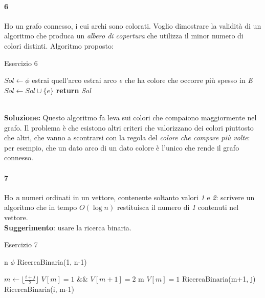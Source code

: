 \paragraph{6}
Ho un grafo connesso, i cui archi sono colorati. Voglio dimostrare la validità di un algoritmo che produca un \textit{albero di copertura} che utilizza il minor numero di colori distinti. Algoritmo proposto: \hfill
\begin{algorithm}
	\caption{Esercizio 6}\label{alg:es6}
	\begin{algorithmic}[1]
		\State $Sol \gets \phi$
		\State estrai quell'arco
		\Else
		\State estrai arco \textit{e} che ha colore che occorre più spesso in \textit{E}
		\EndIf
		\State $Sol \gets Sol \cup \{e\}$
		\EndIf
		\EndWhile
		\State \textbf{return} \textit{Sol}
		\EndFunction
	\end{algorithmic}
\end{algorithm} \\ \hfill
\textbf{Soluzione:} Questo algoritmo fa leva sui colori che compaiono maggiormente nel grafo. Il problema è che esistono altri criteri che valorizzano dei colori piuttosto che altri, che vanno a scontrarsi con la regola del \textit{colore che compare più volte}: per esempio, che un dato arco di un dato colore è l'unico che rende il grafo connesso.

\paragraph{7}
Ho \textit{n} numeri ordinati in un vettore, contenente soltanto valori \textit{1} e \textit{2}: scrivere un algoritmo che in tempo $O(\log{n})$ restituisca il numero di \textit{1} contenuti nel vettore. \\
\textbf{Suggerimento}: usare la ricerca binaria.
\begin{algorithm}
	\caption{Esercizio 7}\label{alg:es7}
	\begin{algorithmic}[1]
		\Return n
		\EndIf
		\Return $\phi$
		\EndIf
		\Return RicercaBinaria(1, n-1)
		\EndFunction
	\end{algorithmic}
	\begin{algorithmic}[1]
		\State $m \gets \lfloor\frac{i+j}{2}\rfloor$
		\If $V[m] = 1$ \&\& $V[m+1] = 2$
		\Return m
		\EndIf
		\If $V[m] = 1$
		\Return RicercaBinaria(m+1, j)
		\EndIf
		\Return RicercaBinaria(i, m-1)
		\EndFunction
	\end{algorithmic}
\end{algorithm} \\ \hfill
\newpage

